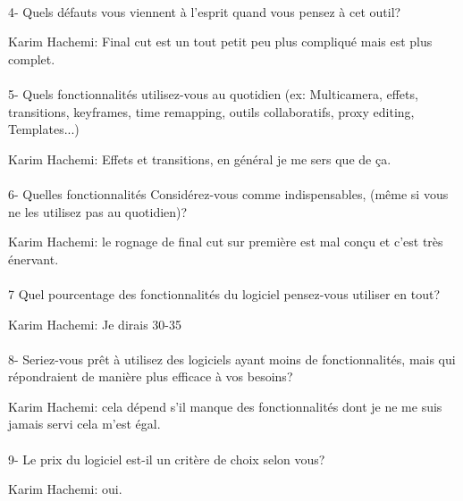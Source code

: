 \paragraph{}

4- Quels défauts vous viennent à l'esprit quand vous pensez à cet outil?

Karim Hachemi: Final cut est un tout petit peu plus compliqué mais
est plus complet.


\paragraph{}
5-  Quels fonctionnalités utilisez-vous au quotidien (ex: Multicamera, effets,
transitions, keyframes, time remapping, outils collaboratifs, proxy
editing, Templates...)

Karim Hachemi: Effets et transitions, en général je me sers que de ça.

\paragraph{}
6-  Quelles fonctionnalités Considérez-vous comme indispensables, (même si vous
ne les utilisez pas au quotidien)?

Karim Hachemi: le rognage de final cut sur première est mal conçu et c'est très
énervant.

\paragraph{}
7 Quel pourcentage des fonctionnalités du logiciel pensez-vous utiliser
en tout?

Karim Hachemi: Je dirais 30-35%

\paragraph{}
8- Seriez-vous prêt à utilisez des logiciels ayant moins de fonctionnalités,
mais qui répondraient de manière plus efficace à vos besoins?

Karim Hachemi: cela dépend s'il manque des fonctionnalités dont je ne me
suis jamais servi cela m'est égal.

\paragraph{}
9-  Le prix du logiciel est-il un critère de choix selon vous?

Karim Hachemi: oui.

